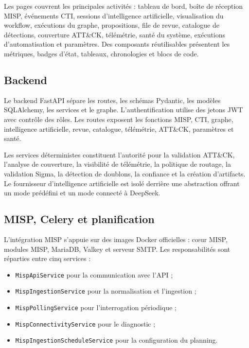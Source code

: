 Les pages couvrent les principales activités : tableau de bord, boîte de réception MISP, événements CTI, sessions d'intelligence artificielle, visualisation du workflow, exécutions du graphe, propositions, file de revue, catalogue de détections, couverture ATT\&CK, télémétrie, santé du système, exécutions d'automatisation et paramètres. Des composants réutilisables présentent les métriques, badges d'état, tableaux, chronologies et blocs de code.

\subsection{Backend}

Le backend FastAPI sépare les routes, les schémas Pydantic, les modèles SQLAlchemy, les services et le graphe. L'authentification utilise des jetons JWT avec contrôle des rôles. Les routes exposent les fonctions MISP, CTI, graphe, intelligence artificielle, revue, catalogue, télémétrie, ATT\&CK, paramètres et santé.

Les services déterministes constituent l'autorité pour la validation ATT\&CK, l'analyse de couverture, la visibilité de télémétrie, la politique de routage, la validation Sigma, la détection de doublons, la confiance et la création d'artifacts. Le fournisseur d'intelligence artificielle est isolé derrière une abstraction offrant un mode prédéfini et un mode connecté à DeepSeek.

\subsection{MISP, Celery et planification}

L'intégration MISP s'appuie sur des images Docker officielles : cœur MISP, modules MISP, MariaDB, Valkey et serveur SMTP. Les responsabilités sont réparties entre cinq services :
\begin{itemize}[leftmargin=1.2cm]
    \item \texttt{MispApiService} pour la communication avec l'API ;
    \item \texttt{MispIngestionService} pour la normalisation et l'ingestion ;
    \item \texttt{MispPollingService} pour l'interrogation périodique ;
    \item \texttt{MispConnectivityService} pour le diagnostic ;
    \item \texttt{MispIngestionScheduleService} pour la configuration du planning.
\end{itemize}

